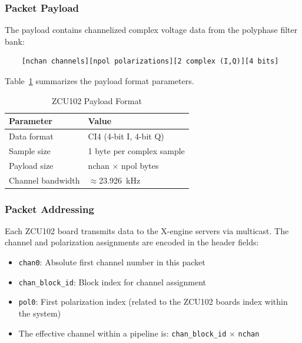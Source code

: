 \subsubsection{Packet Payload}

The payload contains channelized complex voltage data from the polyphase filter bank:

\begin{verbatim}
    [nchan channels][npol polarizations][2 complex (I,Q)][4 bits]
\end{verbatim}

Table~\ref{tab:zcu102-payload} summarizes the payload format parameters.

\begin{table}[htbp]
    \centering
    \caption{ZCU102 Payload Format}
    \label{tab:zcu102-payload}
    \begin{tabular}{ll}
        \toprule
        \textbf{Parameter} & \textbf{Value} \\
        \midrule
        Data format & CI4 (4-bit I, 4-bit Q) \\
        Sample size & 1 byte per complex sample \\
        Payload size & nchan $\times$ npol bytes \\
        Channel bandwidth & $\approx$23.926~kHz \\
        \bottomrule
    \end{tabular}
\end{table}

\subsubsection{Packet Addressing}

Each ZCU102 board transmits data to the X-engine servers via multicast. The channel and polarization assignments are encoded in the header fields:

\begin{itemize}
    \item \texttt{chan0}: Absolute first channel number in this packet
    \item \texttt{chan\_block\_id}: Block index for channel assignment
    \item \texttt{pol0}: First polarization index (related to the ZCU102 boards index within the system)
    \item The effective channel within a pipeline is: \texttt{chan\_block\_id} $\times$ \texttt{nchan}
\end{itemize}

